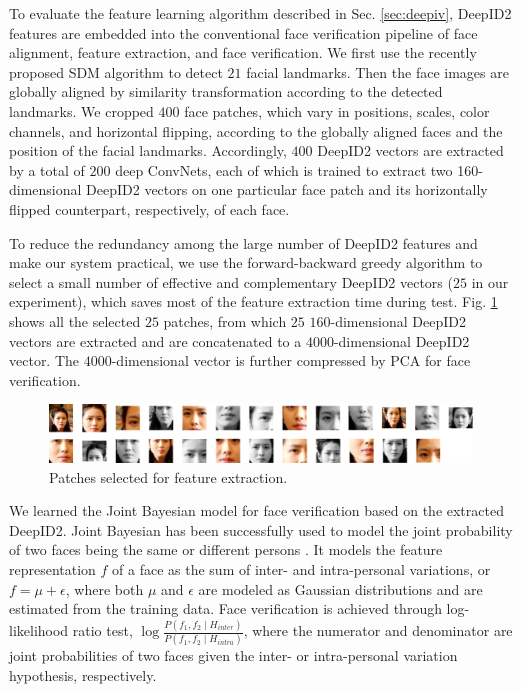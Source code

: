 \documentclass{article} %
\begin{document}
To evaluate the feature learning algorithm described in Sec. \ref{sec:deepiv}, DeepID2 features are embedded into the conventional face verification pipeline of face alignment, feature extraction, and face verification. We first use the recently proposed SDM algorithm \cite{xiong2013} to detect $21$ facial landmarks. Then the face images are globally aligned by similarity transformation according to the detected landmarks. We cropped $400$ face patches, which vary in positions, scales, color channels, and horizontal flipping, according to the globally aligned faces and the position of the facial landmarks. Accordingly, $400$ DeepID2 vectors are extracted by a total of $200$ deep ConvNets, each of which is trained to extract two 160-dimensional DeepID2 vectors on one particular face patch and its horizontally flipped counterpart, respectively, of each face.

To reduce the redundancy among the large number of DeepID2 features and make our system practical, we use the forward-backward greedy algorithm \cite{zhang2011} to select a small number of effective and complementary DeepID2 vectors ($25$ in our experiment), which saves most of the feature extraction time during test.
Fig. \ref{fig:patch} shows all the selected $25$ patches, from which $25$ $160$-dimensional DeepID2 vectors are extracted and are concatenated to a $4000$-dimensional DeepID2 vector. The $4000$-dimensional vector is further compressed by PCA for face verification.

\begin{figure}[t]
\begin{center}
\includegraphics[width = \linewidth]{picture/Picture6.png}
\end{center}
\vspace{-0.1in}
\caption{Patches selected for feature extraction.}
\label{fig:patch}
\vspace{-0.0in}
\end{figure}

We learned the Joint Bayesian model \cite{chen2012} for face verification based on the extracted DeepID2. Joint Bayesian has been successfully used to model the joint probability of two faces being the same or different persons \cite{chen2012,chen2013}. It models the feature representation $f$ of a face as the sum of inter- and intra-personal variations, or $f=\mu+\epsilon$, where both $\mu$ and $\epsilon$ are modeled as Gaussian distributions and are estimated from the training data. Face verification is achieved through log-likelihood ratio test, $\log \frac{P\left(f_1,f_2 \mid H_{inter}\right)}{P\left(f_1,f_2 \mid H_{intra}\right)}$, where the numerator and denominator are joint probabilities of two faces given the inter- or intra-personal variation hypothesis, respectively.
\end{document}
